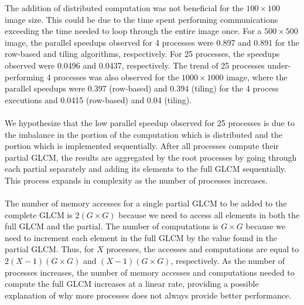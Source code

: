\documentclass{article}
\begin{document}
The addition of distributed computation was not beneficial for the $100 \times 100$ image size. This could be due to the time spent performing communications exceeding the time needed to loop through the entire image once. For a $500 \times 500$ image, the parallel speedups observed for 4 processes were 0.897 and 0.891 for the row-based and tiling algorithms, respectively. For 25 processes, the speedups observed were 0.0496 and 0.0437, respectively. The trend of 25 processes under-performing 4 processes was also observed for the $1000 \times 1000$ image, where the parallel speedups were 0.397 (row-based) and 0.394 (tiling) for the 4 process executions and 0.0415 (row-based) and 0.04 (tiling). \\ \\
We hypothesize that the low parallel speedup observed for 25 processes is due to the imbalance in the portion of the computation which is distributed and the portion which is implemented sequentially. After all processes compute their partial GLCM, the results are aggregated by the root processes by going through each partial separately and adding its elements to the full GLCM sequentially. This process expands in complexity as the number of processes increases. \\ \\ 
The number of memory accesses for a single partial GLCM to be added to the complete GLCM is $2 \left ( G \times G \right)$ because we need to access all elements in both the full GLCM and the partial. The number of computations is $G \times G$ because we need to increment each element in the full GLCM by the value found in the partial GLCM. Thus, for $X$ processes, the accesses and computations are equal to $2(X - 1) \left ( G \times G \right)$ and $(X - 1) \left ( G \times G \right )$, respectively. As the number of processes increases, the number of memory accesses and computations needed to compute the full GLCM increases at a linear rate, providing a possible explanation of why more processes does not always provide better performance. 
\end{document}
